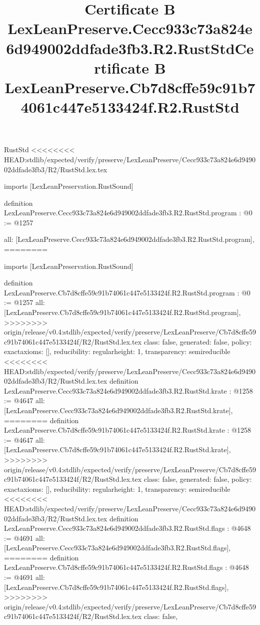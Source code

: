 \begin{lexlean}{RustStd}
<<<<<<<< HEAD:stdlib/expected/verify/preserve/LexLeanPreserve/Cecc933c73a824e6d949002ddfade3fb3/R2/RustStd.lex.tex
\title{Certificate B LexLeanPreserve.Cecc933c73a824e6d949002ddfade3fb3.R2.RustStd}
\begin{coremodule}
imports [LexLeanPreservation.RustSound]

definition LexLeanPreserve.Cecc933c73a824e6d949002ddfade3fb3.R2.RustStd.program : @0 := @1257 {
  all: [LexLeanPreserve.Cecc933c73a824e6d949002ddfade3fb3.R2.RustStd.program],
========
\title{Certificate B LexLeanPreserve.Cb7d8cffe59c91b74061c447e5133424f.R2.RustStd}
\begin{coremodule}
imports [LexLeanPreservation.RustSound]

definition LexLeanPreserve.Cb7d8cffe59c91b74061c447e5133424f.R2.RustStd.program : @0 := @1257 {
  all: [LexLeanPreserve.Cb7d8cffe59c91b74061c447e5133424f.R2.RustStd.program],
>>>>>>>> origin/release/v0.4:stdlib/expected/verify/preserve/LexLeanPreserve/Cb7d8cffe59c91b74061c447e5133424f/R2/RustStd.lex.tex
  class: false,
  generated: false,
  policy: exact{axioms: []},
  reducibility: regular{height: 1},
  transparency: semireducible
}
<<<<<<<< HEAD:stdlib/expected/verify/preserve/LexLeanPreserve/Cecc933c73a824e6d949002ddfade3fb3/R2/RustStd.lex.tex
definition LexLeanPreserve.Cecc933c73a824e6d949002ddfade3fb3.R2.RustStd.krate : @1258 := @4647 {
  all: [LexLeanPreserve.Cecc933c73a824e6d949002ddfade3fb3.R2.RustStd.krate],
========
definition LexLeanPreserve.Cb7d8cffe59c91b74061c447e5133424f.R2.RustStd.krate : @1258 := @4647 {
  all: [LexLeanPreserve.Cb7d8cffe59c91b74061c447e5133424f.R2.RustStd.krate],
>>>>>>>> origin/release/v0.4:stdlib/expected/verify/preserve/LexLeanPreserve/Cb7d8cffe59c91b74061c447e5133424f/R2/RustStd.lex.tex
  class: false,
  generated: false,
  policy: exact{axioms: []},
  reducibility: regular{height: 1},
  transparency: semireducible
}
<<<<<<<< HEAD:stdlib/expected/verify/preserve/LexLeanPreserve/Cecc933c73a824e6d949002ddfade3fb3/R2/RustStd.lex.tex
definition LexLeanPreserve.Cecc933c73a824e6d949002ddfade3fb3.R2.RustStd.flags : @4648 := @4691 {
  all: [LexLeanPreserve.Cecc933c73a824e6d949002ddfade3fb3.R2.RustStd.flags],
========
definition LexLeanPreserve.Cb7d8cffe59c91b74061c447e5133424f.R2.RustStd.flags : @4648 := @4691 {
  all: [LexLeanPreserve.Cb7d8cffe59c91b74061c447e5133424f.R2.RustStd.flags],
>>>>>>>> origin/release/v0.4:stdlib/expected/verify/preserve/LexLeanPreserve/Cb7d8cffe59c91b74061c447e5133424f/R2/RustStd.lex.tex
  class: false,
}}}
\end{coremodule}}
\end{coremodule}
\end{lexlean}
